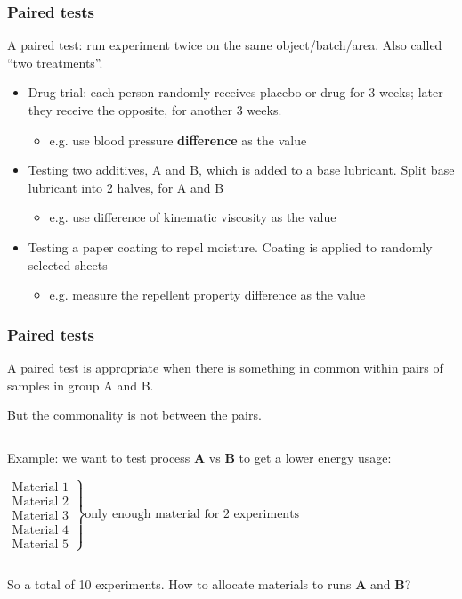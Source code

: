 \begin{frame}\frametitle{Paired tests}

	A paired test: run experiment twice on the same object/batch/area. Also called ``two treatments''.
	\begin{itemize}
		\item Drug trial: each person randomly receives placebo or drug for 3 weeks; later they receive the opposite, for another 3 weeks.
		\begin{itemize}
			\item e.g. use blood pressure \textbf{difference} as the value
		\end{itemize}
		\item Testing two additives, A and B, which is added to a base lubricant. Split base lubricant into 2 halves, for A and B
		\begin{itemize}
			\item e.g. use difference of kinematic viscosity as the value
		\end{itemize}
		\item Testing a paper coating to repel moisture. Coating is applied to randomly selected sheets
		\begin{itemize}
			\item e.g. measure the repellent property difference as the value
		\end{itemize}
	\end{itemize}
\end{frame}

\begin{frame}\frametitle{Paired tests}

	A paired test is appropriate when there is something in common within pairs of samples in group A and B.

	But the commonality is not between the pairs.

	$\qquad$

	Example: we want to test process \textbf{A} vs \textbf{B} to get a lower energy usage:

	$ \left.
	\begin{array}{r}
		\text{Material 1}\\
		\text{Material 2}\\
		\text{Material 3}\\
		\text{Material 4}\\
		\text{Material 5}
	\end{array}
	\right\} \text{only enough material for 2 experiments} $

	$\qquad$

	So a total of 10 experiments. How to allocate materials to runs \textbf{A} and \textbf{B}?
\end{frame}

